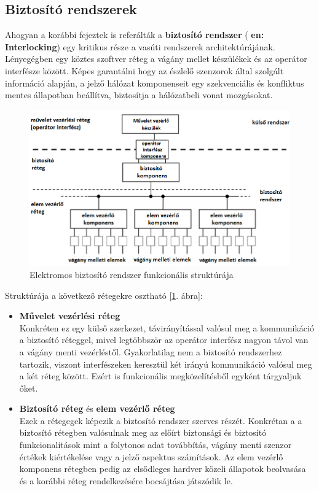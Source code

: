 \documentclass[a4paper,12pt]{article}
\begin{document}
\subsection{Biztosító rendszerek}
Ahogyan a korábbi fejeztek is referálták a \textbf{biztosító rendszer} ( \textbf{en: Interlocking}) egy kritikus része a vasúti rendszerek architektúrájának.
Lényegégben egy köztes szoftver réteg a vágány mellet készülékek és az operátor interfésze között.
Képes garantálni hogy az észlelő szenzorok által szolgált információ alapján, a jelző hálózat komponenseit egy szekvenciális és konfliktus mentes állapotban beállítva, biztosítja a hálózatbeli vonat mozgásokat.

\begin{figure}[htp]
	\centering
	\includegraphics[width=\linewidth]{images/interlocking_functional_structure.png}
	\caption[Intrlocking funkcionális struktúra]{Elektromos biztosító rendszer funkcionális struktúrája}
	\label{fig:interlocking_functional_structure}
\end{figure}


Struktúrája a következő rétegekre osztható [\ref{fig:interlocking_functional_structure}. ábra]:
\begin{itemize}
	\item \textbf{Művelet vezérlési réteg} \\
	Konkréten ez egy külső szerkezet, távirányítással valósul meg a kommunikáció a biztosító réteggel, mivel legtöbbször az operátor interfész nagyon távol van a vágány menti vezérléstől.
	Gyakorlatilag nem a biztosító rendszerhez tartozik, viszont interfészeken keresztül két irányú kommunikáció valósul meg a két réteg között.
	Ezért is funkcionális megközelítésből egyként tárgyaljuk őket.
	\item \textbf{Biztosító réteg} és \textbf{elem vezérlő réteg} \\
	Ezek a rétegegek képezik a biztosító rendszer szerves részét.
	Konkrétan a a biztosító rétegben valósulnak meg az előírt biztonsági és biztosító funkcionalitások mint a folytonos adat továbbítás, vágány menti szenzor értékek kiértékelése vagy a jelző aspektus számítások.
	Az elem vezérlő komponens rétegben pedig az elsődleges hardver közeli állapotok beolvasása és a korábbi réteg rendelkezésére bocsájtása játszódik le. 
\end{itemize}
\end{document}
